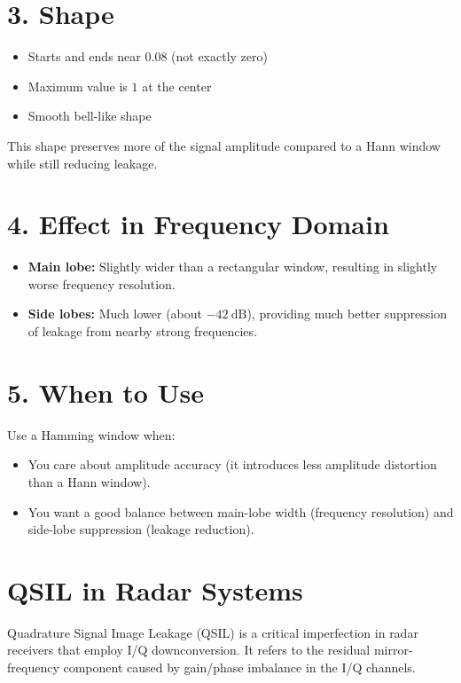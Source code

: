 \documentclass{article}
\begin{document}
\section*{3. Shape}

\begin{itemize}[nosep]
    \item Starts and ends near \(0.08\) (not exactly zero)
    \item Maximum value is \(1\) at the center
    \item Smooth bell-like shape
\end{itemize}

This shape preserves more of the signal amplitude compared to a Hann window while still reducing leakage.

\section*{4. Effect in Frequency Domain}

\begin{itemize}[nosep]
    \item \textbf{Main lobe:} Slightly wider than a rectangular window, resulting in slightly worse frequency resolution.
    \item \textbf{Side lobes:} Much lower (about \(-42\ \mathrm{dB}\)), providing much better suppression of leakage from nearby strong frequencies.
\end{itemize}

\section*{5. When to Use}

Use a Hamming window when:
\begin{itemize}[nosep]
    \item You care about amplitude accuracy (it introduces less amplitude distortion than a Hann window).
    \item You want a good balance between main-lobe width (frequency resolution) and side-lobe suppression (leakage reduction).
\end{itemize}
\section{QSIL in Radar Systems}

Quadrature Signal Image Leakage (QSIL) is a critical imperfection in radar receivers that employ I/Q downconversion.  
It refers to the residual mirror-frequency component caused by gain/phase imbalance in the I/Q channels.
\end{document}
